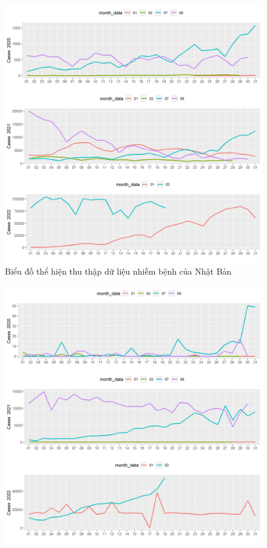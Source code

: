 \documentclass[a4paper]{article}
\theoremstyle{definition}
\begin{document}
\begin{enumerate}[i)]
\begin{enumerate}[1)]
\begin{figure}[htp]
		    \centering
		    \includegraphics[scale = 0.7]{Images/V/v1 Japan .jpeg}
		    \caption{Biểu đồ thể hiện thu thập dữ liệu nhiễm bệnh của Nhật Bản}
		    \label{fig:my_label}
		\end{figure}
		\begin{figure}[htp]
		    \centering
		    \includegraphics[scale = 0.7]{Images/V/v1 Vietnam .jpeg}

\end{figure}
\end{enumerate}
\end{enumerate}
\end{document}
